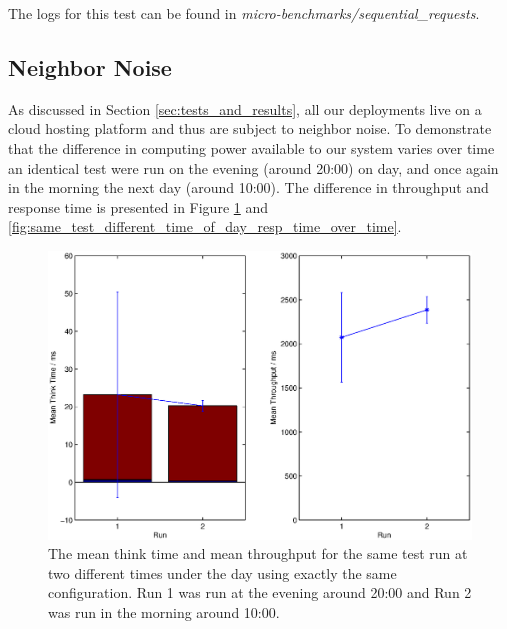 \documentclass{article}
\begin{document}
 
        The logs for this test can be found in \textit{micro-benchmarks/sequential\_requests}.
        \subsection{Neighbor Noise} 
        As discussed in Section \ref{sec:tests_and_results}, all our deployments live on a cloud hosting platform and thus are subject to neighbor noise. To demonstrate that the difference in computing power available to our system varies over time an identical test were run on the evening (around 20:00) on day, and once again in the morning the next day (around 10:00). The difference in throughput and response time is presented in Figure \ref{fig:same_test_different_time_of_day} and \ref{fig:same_test_different_time_of_day_resp_time_over_time}.

    
        \begin{figure}[H]
                \centerline{\includegraphics[scale=0.50]{same_test_different_time_of_day}}
                \caption{The mean think time and mean throughput for the same test run at two different times under the day using exactly the same configuration. Run 1 was run at the evening around 20:00 and Run 2 was run in the morning around 10:00.}
                \label{fig:same_test_different_time_of_day}
        \end{figure}
    
\end{document}
